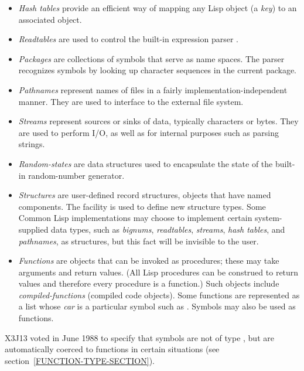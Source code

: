 \begin{itemize}
\item
\emph{Hash tables} provide an efficient way of mapping any
Lisp object (a \emph{key}) to an associated object.

\item
\emph{Readtables} are used to control the built-in expression parser
.

\item
\emph{Packages} are collections of symbols that serve as name spaces.
The parser recognizes symbols by looking up character sequences
in the current package.

\item
\emph{Pathnames} represent names of files in a fairly implementation-independent
manner.  They are used to interface to the external file system.

\item
\emph{Streams} represent sources or sinks of data, typically characters
or bytes.  They are used to perform I/O, as well as for internal
purposes such as parsing strings.

\item
\emph{Random-states} are data structures used to encapsulate the state
of the built-in random-number generator.

\item
\emph{Structures} are user-defined record structures, objects that
have named components.  The  facility is used
to define new structure types.  Some Common Lisp implementations may
choose to implement certain system-supplied data types,
such as \emph{bignums}, \emph{readtables}, \emph{streams},
\emph{hash tables}, and \emph{pathnames}, as structures,
but this fact will be invisible to the user.
\end{itemize}

\begin{obsolete}
\begin{itemize}
\item
\emph{Functions} are objects that can be invoked as procedures;
these may take arguments and return values.  (All Lisp procedures
can be construed to return values and therefore every procedure is
a function.)
Such objects include \emph{compiled-functions} (compiled code objects).
Some functions are represented as a list whose \emph{car} is a particular
symbol such as .
Symbols may also be used as functions.
\end{itemize}
\end{obsolete}

\begin{newer}
X3J13 voted in June 1988 
to specify that symbols are not of type ,
but are automatically coerced to functions
in certain situations (see section~\ref{FUNCTION-TYPE-SECTION}).
\end{newer}

